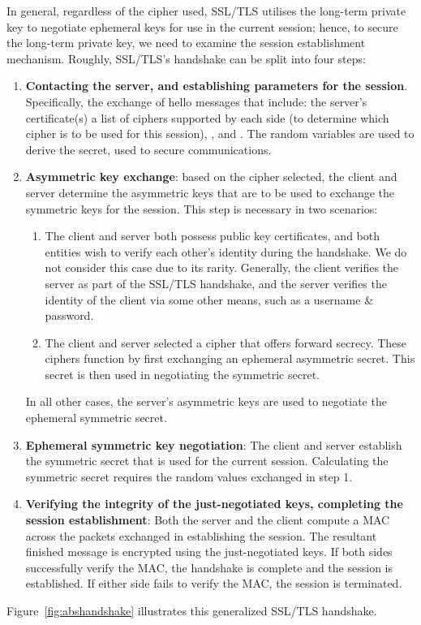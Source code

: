 \documentclass[../main.tex]{subfiles}
\begin{document}
\label{sec:ssloverview}
In general, regardless of the cipher used, SSL/TLS utilises the
long-term private key to negotiate ephemeral keys for use in the
current session; hence, to secure the long-term private key, we need
to examine the session establishment mechanism. Roughly, SSL/TLS's
handshake can be split into four steps:

\begin{enumerate}
  \item \textbf{Contacting the server, and establishing parameters for
    the session}. Specifically, the exchange of hello messages that
    include: the server's certificate(s) a list of ciphers supported by
    each side (to determine which cipher is to be used for this session),
    \srandom, and \crandom. The random variables are used to derive the
    secret, used to secure communications.
  \item \textbf{Asymmetric key exchange}: based on the cipher
    selected, the client and server determine the asymmetric keys that are
    to be used to exchange the symmetric keys for the session. This step
    is necessary in two scenarios:
    \begin{enumerate}
      \item The client and server both possess public key
        certificates, and both entities wish to verify each other's identity
        during the handshake. We do not consider this case due to its
        rarity. Generally, the client verifies the server as part of the
        SSL/TLS handshake, and the server verifies the identity of the client
        via some other means, such as a username \& password.
      \item The client and server selected a cipher that offers
        forward secrecy. These ciphers function by first exchanging an
        ephemeral asymmetric secret. This secret is then used in negotiating
        the symmetric secret.
    \end{enumerate} In all other cases, the server's asymmetric keys
    are used to negotiate the ephemeral symmetric secret.
  \item \textbf{Ephemeral symmetric key negotiation}: The client and
    server establish the symmetric secret that is used for the current
    session. Calculating the symmetric secret requires the random values
    exchanged in step 1.
  \item \textbf{Verifying the integrity of the just-negotiated keys,
    completing the session establishment}: Both the server and the client
    compute a MAC across the packets exchanged in establishing the
    session. The resultant finished message is encrypted using the
    just-negotiated keys. If both sides successfully verify the MAC, the
    handshake is complete and the session is established. If either side
    fails to verify the MAC, the session is terminated.
\end{enumerate} Figure~\ref{fig:abshandshake} illustrates this
generalized SSL/TLS handshake.
\end{document}
